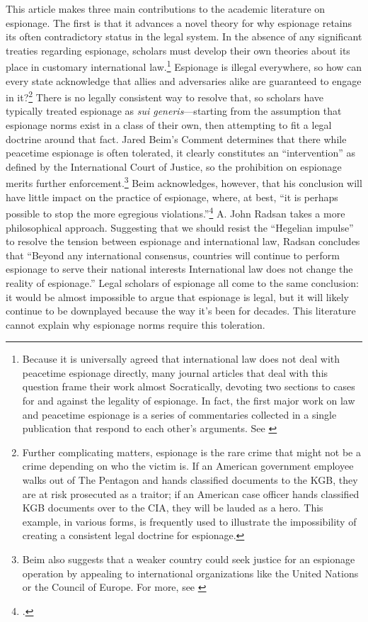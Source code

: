 \documentclass[14pt]{extarticle}
\begin{document}
This article makes three main contributions to the academic literature on espionage. The first is that it advances a novel theory for why espionage retains its often contradictory status in the legal system. In the absence of any significant treaties regarding espionage, scholars must develop their own theories about its place in customary international law.\footnote{Because it is universally agreed that international law does not deal with peacetime espionage directly, many journal articles that deal with this question frame their work almost Socratically, devoting two sections to cases for and against the legality of espionage. In fact, the first major work on law and peacetime espionage is a series of commentaries collected in a single publication that respond to each other's arguments. See \cite{wright_essays_1962}} Espionage is illegal everywhere, so how can every state acknowledge that allies and adversaries alike are guaranteed to engage in it?\footnote{Further complicating matters, espionage is the rare crime that might not be a crime depending on who the victim is. If an American government employee walks out of The Pentagon and hands classified documents to the KGB, they are at risk prosecuted as a traitor; if an American case officer hands classified KGB documents over to the CIA, they will be lauded as a hero. This example, in various forms, is frequently used to illustrate the impossibility of creating a consistent legal doctrine for espionage.} There is no legally consistent way to resolve that, so scholars have typically treated espionage as \emph{sui generis}---starting from the assumption that espionage norms exist in a class of their own, then attempting to fit a legal doctrine around that fact. Jared Beim's Comment determines that there while peacetime espionage is often tolerated, it clearly constitutes an \enquote{intervention} as defined by the International Court of Justice, so the prohibition on espionage merits further enforcement.\footnote{Beim also suggests that a weaker country could seek justice for an espionage operation by appealing to international organizations like the United Nations or the Council of Europe. For more, see \cite{beim_enforcing_2018}} Beim acknowledges, however, that his conclusion will have little impact on the practice of espionage, where, at best, \enquote{it is perhaps possible to stop the more egregious violations.}\footcite[p.~672]{beim_enforcing_2018} A. John Radsan takes a more philosophical approach. Suggesting that we should resist the \enquote{Hegelian impulse} to resolve the tension between espionage and international law, Radsan concludes that \enquote{Beyond any international consensus, countries will continue to perform espionage to serve their national interests \textelp{} International law does not change the reality of espionage.} Legal scholars of espionage all come to the same conclusion: it would be almost impossible to argue that espionage is legal, but it will likely continue to be downplayed because the way it's been for decades. This literature cannot explain why espionage norms require this toleration.
\end{document}
